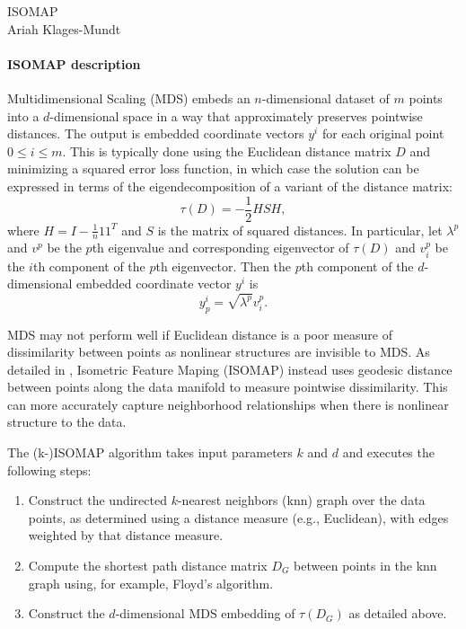 \documentclass[11pt]{article}
\newcommand{\yourtitle}{ISOMAP}
\begin{document}
\begin{center}\LARGE\yourtitle\\
\large Ariah Klages-Mundt
\end{center}

\paragraph{ISOMAP description}


Multidimensional Scaling (MDS) embeds an $n$-dimensional dataset of $m$ points into a $d$-dimensional space in a way that approximately preserves pointwise distances. The output is embedded coordinate vectors $y^i$ for each original point $0\leq i \leq m$. This is typically done using the Euclidean distance matrix $D$ and minimizing a squared error loss function, in which case the solution can be expressed in terms of the eigendecomposition of a variant of the distance matrix:
$$\tau(D) = -\frac{1}{2}HSH,$$ 
where $H = I - \frac{1}{n} 1 1^T$ and $S$ is the matrix of squared distances. In particular, let $\lambda^p$ and $v^p$ be the $p$th eigenvalue and corresponding eigenvector of $\tau(D)$ and $v^p_i$ be the $i$th component of the $p$th eigenvector. Then the $p$th component of the $d$-dimensional embedded coordinate vector $y^i$ is
\begin{equation}y^i_p = \sqrt{\lambda^p} v^p_i.\label{eq:mds_coord}\end{equation}

MDS may not perform well if Euclidean distance is a poor measure of dissimilarity between points as nonlinear structures are invisible to MDS. As detailed in \cite{isomap}, Isometric Feature Maping (ISOMAP) instead uses geodesic distance between points along the data manifold to measure pointwise dissimilarity. This can more accurately capture neighborhood relationships when there is nonlinear structure to the data.

The (k-)ISOMAP algorithm takes input parameters $k$ and $d$ and executes the following steps:
\begin{enumerate}
	\item Construct the undirected $k$-nearest neighbors (knn) graph over the data points, as determined using a distance measure (e.g., Euclidean), with edges weighted by that distance measure.
	\item Compute the shortest path distance matrix $D_G$ between points in the knn graph using, for example, Floyd's algorithm.
	\item Construct the $d$-dimensional MDS embedding of $\tau(D_G)$ as detailed above.
\end{enumerate}
\end{document}
